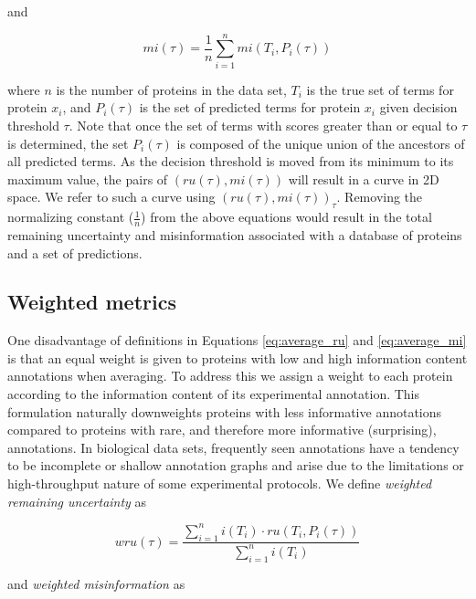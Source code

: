 \noindent and

\begin{equation}
mi(\tau)=\frac{1}{n}\sum_{i=1}^{n}mi(T_{i},P_{i}(\tau))\label{eq:average_mi}
\end{equation}


\noindent where $n$ is the number of proteins in the data set, $T_{i}$ is the true set of terms for protein $x_{i}$, and $P_{i}(\tau)$ is the set of predicted terms for protein $x_{i}$ given decision threshold $\tau$. Note that once the set of terms with scores greater than or equal to $\tau$ is determined, the set $P_{i}(\tau)$ is composed of the unique union of the ancestors of all predicted terms. As the decision threshold is moved from its minimum to its maximum value, the pairs of $(ru(\tau),mi(\tau))$ will result in a curve in 2D space. We refer to such a curve using $(ru(\tau),mi(\tau))_{\tau}$. Removing the normalizing constant ($\frac{1}{n}$) from the above equations would result in the total remaining uncertainty and misinformation associated with a database of proteins and a set of predictions.


\subsection{Weighted metrics}

One disadvantage of definitions in Equations \ref{eq:average_ru} and \ref{eq:average_mi} is that an equal weight is given to proteins with low and high information content annotations when averaging. To address this we assign a weight to each protein according to the information content of its experimental annotation. This formulation naturally downweights proteins with less informative annotations compared to proteins with rare, and therefore more informative (surprising), annotations. In biological data sets, frequently seen annotations have a tendency to be incomplete or shallow annotation graphs and arise due to the limitations or high-throughput nature of some experimental protocols. We define \emph{weighted remaining uncertainty} as

\begin{equation}
wru(\tau)=\frac{\sum_{i=1}^{n}i(T_{i})\cdot ru(T_{i},P_{i}(\tau))}{\sum_{i=1}^{n}i(T_{i})}
\label{eq:weighted_ru}
\end{equation}

\noindent and \emph{weighted misinformation} as

